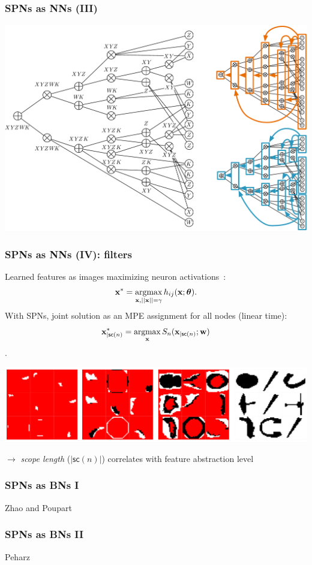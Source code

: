 \documentclass[xcolor={usenames,dvipsnames,svgnames}, compress]{beamer}
\newcommand{\argmax}{\operatornamewithlimits{argmax}}
\begin{document}
\begin{frame}
  \frametitle{SPNs as NNs (III)}
  \begin{center}
    \includegraphics[width=0.8\columnwidth]{figures/layered-spn.pdf}
  \end{center}
\end{frame}

\begin{frame}
  \frametitle{SPNs as NNs (IV): filters}
  \small
  Learned features as images maximizing neuron activations~\parencite{Erhan2009}:
  $$\mathbf{x}^{*} = \argmax_{\mathbf{x},
    ||\mathbf{x}||=\gamma}h_{ij}(\mathbf{x};\boldsymbol\theta).$$
  With SPNs, joint solution as an MPE assignment for all nodes (linear time):
  $$\mathbf{x}^{*}_{|\mathsf{sc}(n)} =
  \argmax_{\mathbf{x}}S_{n}(\mathbf{x}_{|\mathsf{sc}(n)};
  \mathbf{w})$$.
  \begin{center}
    \vspace{-15pt}
    \includegraphics[width=0.9\linewidth]{figures/filters.jpg}
  \end{center}
  $\rightarrow$ \emph{scope length} ($|\mathsf{sc}(n)|$) correlates with feature abstraction level
\end{frame}

\begin{frame}
  \frametitle{SPNs as BNs I}
  Zhao and Poupart
\end{frame}

\begin{frame}
  \frametitle{SPNs as BNs II}
  Peharz
\end{frame}
\end{document}
